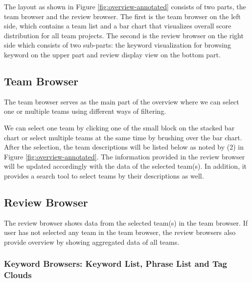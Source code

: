 \documentclass{sigchi}
\begin{document}
The layout as shown in Figure \ref{fig:overview-annotated} consists of two
parts, the team browser and the review browser.  The first is the team browser
on the left side, which contains a team list and a bar chart that visualizes
overall score distribution for all team projects. The second is the review
browser on the right side which consists of two sub-parts: the keyword
visualization for browsing keyword on the upper part and review display view on
the bottom part.


\subsection{Team Browser}
The team browser serves as the main part of the overview
where we can select one or multiple teams using different ways of filtering.

We can select one team by clicking one of the small block on the stacked bar
chart or select multiple teams at the same time by brushing over the bar chart.
After the selection, the team descriptions will be listed below as noted by (2)
in Figure \ref{fig:overview-annotated}. The information provided in the review
browser will be updated accordingly with the data of the selected team(s). In
addition, it provides a search tool to select teams by their descriptions as
well.

\subsection{Review Browser}

The review browser shows data from the selected team(s) in the team browser. If
user has not selected any team in the team browser,  the review browsers also
provide overview by showing aggregated data of all teams.

\subsubsection{Keyword Browsers: Keyword List, Phrase List and Tag Clouds}
\end{document}
